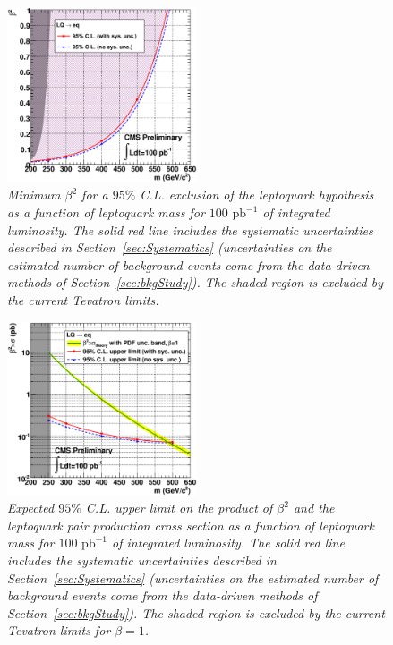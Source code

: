 \begin{figure}[h!]
 \centering
  \includegraphics[width=0.5\textwidth]{plots/cmsPotential/beta2_vs_m_excl.eps}
 \caption{\small \sl Minimum $\beta^2$ for
a $95\%$ C.L. exclusion of the leptoquark hypothesis as a function of leptoquark mass for $100\text{ pb}^{-1}$ of integrated luminosity. 
The solid red line includes the systematic uncertainties described in Section~\ref{sec:Systematics}
(uncertainties on the estimated number of background events come from the data-driven methods of Section~\ref{sec:bkgStudy}).
The shaded region is excluded by the current Tevatron limits.
\label{fig:exclusion_beta}}
\end{figure}


\begin{figure}[h!]
 \centering
  \includegraphics[width=0.5\textwidth]{plots/cmsPotential/xs95CL_vs_m_log.eps}
 \caption{\small \sl Expected $95\%$ C.L. upper limit on the product of $\beta^2$ and the leptoquark pair production cross section 
as a function of leptoquark mass for $100\text{ pb}^{-1}$ of integrated luminosity. 
The solid red line includes the systematic uncertainties described in Section~\ref{sec:Systematics}
(uncertainties on the estimated number of background events come from the data-driven methods of Section~\ref{sec:bkgStudy}).
The shaded region is excluded by the current Tevatron limits for $\beta=1$.
\label{fig:exclusion_xs}}
\end{figure}


